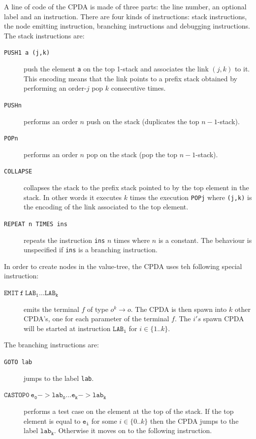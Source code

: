 A line of code of the CPDA is made of three parts: the line number, an optional label and an instruction. There are four kinds of instructions: stack instructions, the node emitting instruction, branching instructions and debugging instructions. The stack instructions are:
\begin{description}
  \item[{\tt PUSH1 a (j,k)}] push the element {\tt a} on the top 1-stack and associates the link $(j,k)$ to it. This encoding means that the link points to a prefix stack obtained by performing an order-$j$ pop $k$ consecutive times.
  \item[{\tt PUSHn}] performs an order $n$ push on the stack (\ie duplicates the top $n-1$-stack).
  \item[{\tt POPn}] performs an order $n$ pop on the stack (\ie pop the top $n-1$-stack).
  \item[{\tt COLLAPSE}] collapses the stack to the prefix stack pointed to by the top element in the stack. In other words it executes $k$ times the execution {\tt POPj} where {\tt (j,k)} is the encoding of the link associated to the top element.

  \item[{\tt REPEAT n TIMES ins}] repeats the instruction {\tt ins} $n$ times where $n$ is a constant. The behaviour is unspecified if {\tt ins} is a branching instruction.
\end{description}

In order to create nodes in the value-tree, the CPDA uses teh following special instruction:
\begin{description}
  \item[$\mathtt{EMIT\ f\ LAB_1 \ldots LAB_k}$] emits the terminal $f$ of type $o^k \rightarrow o$.
   The CPDA is then spawn into $k$ other CPDA's, one for each parameter of the terminal $f$.
   The $i's$ spawn CPDA will be started at instruction $\mathtt{LAB_i}$ for $i \in \{1..k\}$.
\end{description}

The branching instructions are:
\begin{description}
  \item[{\tt GOTO lab}] jumps to the label {\tt lab}.
  \item[$\mathtt{CASTOP0\ e_0->lab_0 ... e_k->lab_k}$] performs a test case on the element
  at the top of the stack. If the top element is equal to $\mathtt{e_i}$ for some $i \in \{0..k\}$
  then the CPDA jumps to the label $\mathtt{lab_k}$. Otherwise it moves on to the following instruction.
\end{description}


